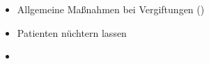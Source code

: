 \label{m:schaumbildner}
\begin{itemize}
    \item Allgemeine Maßnahmen bei Vergiftungen
    ()
    \item Patienten nüchtern lassen
    \item {}
\end{itemize}